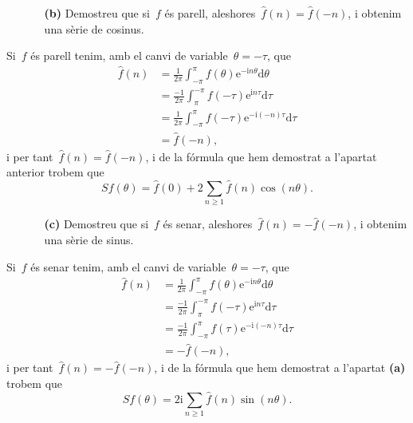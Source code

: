 \documentclass[a4paper]{article}
\newcommand{\iu}{\mathrm{i}}
\newcommand{\e}{\mathrm{e}}
\newcommand{\uppi}{\pi}
\newcommand{\diff}{\mathrm{d}}
\begin{document}
\begin{enumerate}
    \item[]\begin{enumerate}
        \item[\textbf{(b)}] Demostreu que si~\(f\) és parell,
            aleshores~\(\widehat{f}(n) = \widehat{f}(-n)\), i obtenim una sèrie
            de cosinus.
    \end{enumerate}
\end{enumerate}
Si~\(f\) és parell tenim, amb el canvi de variable~\(\theta = -\tau\), que
\begin{align*}
    \widehat{f}(n) &= \frac{1}{2\uppi}
                      \int_{-\uppi}^{\uppi}f(\theta)\e^{-\iu n\theta}\diff
                      \theta \\
                   &= \frac{-1}{2\uppi}
                      \int_{\uppi}^{-\uppi}f(-\tau)\e^{\iu n\tau}\diff
                      \tau \\
                   &= \frac{1}{2\uppi}
                      \int_{-\uppi}^{\uppi}f(-\tau)\e^{-\iu(-n)\tau}\diff
                      \tau \\
                   &= \widehat{f}(-n),
\end{align*}
i per tant~\(\widehat{f}(n) = \widehat{f}(-n)\), i de la fórmula que hem
demostrat a l'apartat anterior trobem que
\[
    Sf(\theta) = \widehat{f}(0) + 2\sum_{n\geq1}\widehat{f}(n)\cos(n\theta).
\]

\begin{enumerate}
    \item[]\begin{enumerate}
        \item[\textbf{(c)}] Demostreu que si~\(f\) és senar,
            aleshores~\(\widehat{f}(n) = -\widehat{f}(-n)\), i obtenim una sèrie
            de sinus.
    \end{enumerate}
\end{enumerate}
Si~\(f\) és senar tenim, amb el canvi de variable~\(\theta = -\tau\), que
\begin{align*}
    \widehat{f}(n) &= \frac{1}{2\uppi}
                      \int_{-\uppi}^{\uppi}f(\theta)\e^{-\iu n\theta}\diff
                      \theta \\
                   &= \frac{-1}{2\uppi}
                      \int_{\uppi}^{-\uppi}f(-\tau)\e^{\iu n\tau}\diff
                      \tau \\
                   &= \frac{-1}{2\uppi}
                      \int_{-\uppi}^{\uppi}f(\tau)\e^{-\iu(-n)\tau}\diff
                      \tau \\
                   &= -\widehat{f}(-n),
\end{align*}
i per tant~\(\widehat{f}(n) = -\widehat{f}(-n)\), i de la fórmula que hem
demostrat a l'apartat \textbf{(a)} trobem que
\[
    Sf(\theta) = 2\iu\sum_{n\geq1}\widehat{f}(n)\sin(n\theta).
\]
\end{document}
